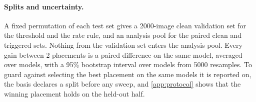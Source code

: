 \paragraph{Splits and uncertainty.}
A fixed permutation of each test set gives a 2000-image clean validation set for the threshold and the rate rule, and an analysis pool for the paired clean and triggered sets. Nothing from the validation set enters the analysis pool. Every gain between 2 placements is a paired difference on the same model, averaged over models, with a 95\% bootstrap interval \cite{efron1993bootstrap} over models from 5000 resamples. To guard against selecting the best placement on the same models it is reported on, the basis declares a split before any sweep, and \cref{app:protocol} shows that the winning placement holds on the held-out half.
